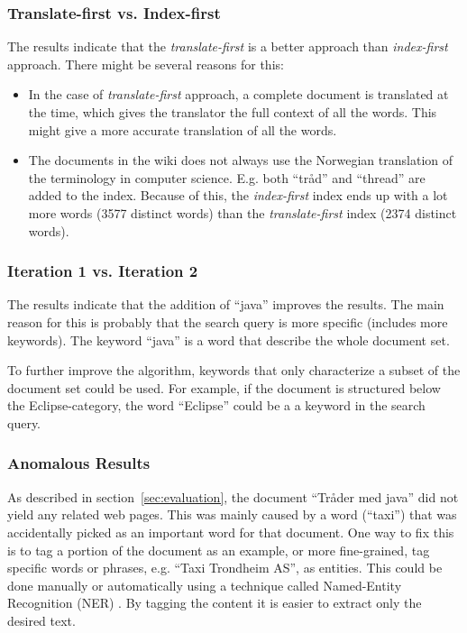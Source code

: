 \documentclass[a4paper]{book}
\begin{document}
\subsubsection{Translate-first vs. Index-first}

The results indicate that the \textit{translate-first} is a better approach than \textit{index-first} approach. There might be several reasons for this:
\begin{itemize}
\item In the case of \textit{translate-first} approach, a complete document is translated at the time, which gives the translator the full context of all the words. This might give a more accurate translation of all the words.
\item The documents in the wiki does not always use the Norwegian translation of the terminology in computer science. E.g. both ``tråd'' and ``thread'' are added to the index. Because of this, the \textit{index-first} index ends up with a lot more words (3577 distinct words) than the \textit{translate-first} index (2374 distinct words).
\end{itemize}

\subsubsection{Iteration 1 vs. Iteration 2}

The results indicate that the addition of ``java'' improves the results. The main reason for this is probably that the search query is more specific (includes more keywords). The keyword ``java'' is a word that describe the whole document set.

To further improve the algorithm, keywords that only characterize a subset of the document set could be used. For example, if the document is structured below the Eclipse-category, the word ``Eclipse'' could be a a keyword in the search query.

\subsubsection{Anomalous Results}

As described in section~\ref{sec:evaluation}, the document ``Tråder med java'' did not yield any related web pages. This was mainly caused by a word (``taxi'') that was accidentally picked as an important word for that document. One way to fix this is to tag a portion of the document as an example, or more fine-grained, tag specific words or phrases, e.g. ``Taxi Trondheim AS'', as entities. This could be done manually or automatically using a technique called Named-Entity Recognition (NER) \cite{introToIR}. By tagging the content it is easier to extract only the desired text.
\end{document}
